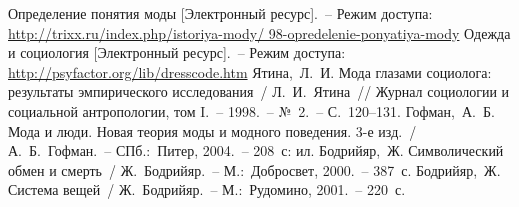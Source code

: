   \renewcommand{\bibname}{Список литературы}
  \begin{thebibliography}{9}
     Определение понятия моды [Электронный ресурс].~--
      Режим доступа:\\
      \url{http://trixx.ru/index.php/istoriya-mody/
        98-opredelenie-ponyatiya-mody}
     Одежда и социология [Электронный ресурс].~--
      Режим доступа:\\
      \url{http://psyfactor.org/lib/dresscode.htm}
     Ятина,~Л.~И. Мода глазами социолога: результаты
      эмпирического исследования~/ Л.~И.~Ятина~// Журнал социологии и
      социальной антропологии, том I.~-- 1998.~-- №~2.~-- С.~120--131.
     Гофман,~А.~Б. Мода и люди. Новая теория моды и модного
      поведения. 3-е изд.~/ А.~Б.~Гофман.~-- СПб.:~Питер, 2004.~-- 208~с: ил.
     Бодрийяр,~Ж. Символический обмен и смерть~/
      Ж.~Бодрийяр.~-- М.:~Добросвет, 2000.~-- 387~с.
     Бодрийяр,~Ж. Система вещей~/
      Ж.~Бодрийяр.~-- М.:~Рудомино, 2001.~-- 220~с.
  \end{thebibliography}


